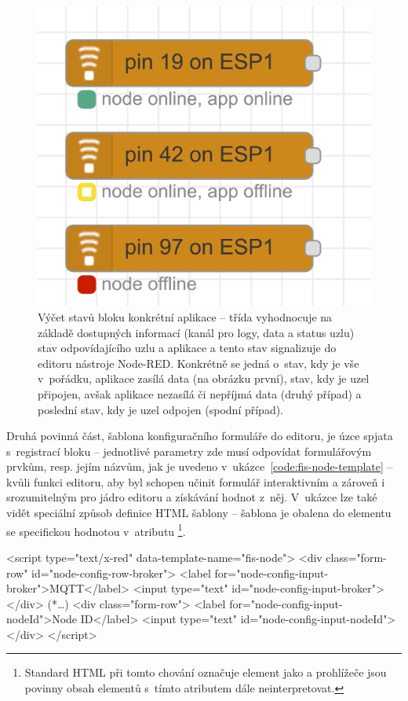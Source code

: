 \begin{figure}
    \centering
    \includegraphics[width=.5\textwidth]{figures/fis-node-status.png}
    \caption{Výčet stavů bloku konkrétní aplikace -- třída  vyhodnocuje na základě dostupných informací
    (kanál pro logy, data a status uzlu) stav odpovídajícího uzlu a aplikace a tento stav signalizuje do editoru
    nástroje Node-RED. Konkrétně se jedná o~stav, kdy je vše v~pořádku, aplikace zasílá data (na obrázku první),
    stav, kdy je uzel připojen, avšak aplikace nezasílá či nepříjmá data (druhý případ) a poslední stav,
    kdy je uzel odpojen (spodní případ).}
    \label{fig:fis-node-status}
\end{figure}

Druhá povinná část, šablona konfiguračního formuláře do editoru, je úzce spjata s~registrací bloku -- jednotlivé
parametry zde musí odpovídat formulářovým prvkům, resp. jejím názvům, jak je uvedeno
v~ukázce~\ref{code:fis-node-template} -- kvůli funkci editoru, aby byl schopen učinit
formulář interaktivním a zároveň i srozumitelným pro jádro editoru a získávání hodnot z~něj.
V~ukázce lze také vidět speciální způsob definice HTML šablony -- šablona je obalena do elementu  se
specifickou hodnotou v~atributu \footnote{Standard HTML při tomto chování označuje
element  jako  a prohlížeče jsou povinny obsah elementů s~tímto atributem dále
neinterpretovat.}.

\begin{code}[
    language=HTML,
    label=code:fis-node-template,
    caption={Ukázka z~implementace druhé povinné části deklarace bloku -- šablona formuláře v~jazyce HTML obsahuje
    jednotlivé vstupní pro pole pro korespondující parametry definovené v~registraci bloku do editoru
    v~ukázce~\ref{code:fis-node-constructor}.
    Atribut \ic{id="node-config-input-broker"} (a odpovídající) jsou důležité vzhledem k~chování editoru, nutná je shoda
    s~názvem parametru při registraci bloku -- stejně jako správné spárování šablony pomocí atributu
    \ic{data-template-name="fis-node"}.},
]
<script type="text/x-red" data-template-name="fis-node">
    <div class="form-row" id="node-config-row-broker">
        <label for="node-config-input-broker">MQTT</label>
        <input type="text" id="node-config-input-broker">
    </div>
    (*\ldots*)
    <div class="form-row">
        <label for="node-config-input-nodeId">Node ID</label>
        <input type="text" id="node-config-input-nodeId">
    </div>
</script>
\end{code}

